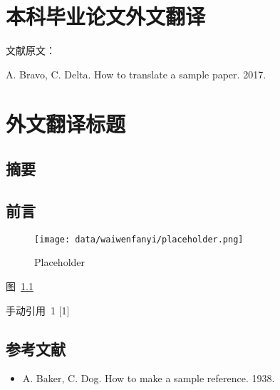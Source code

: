 {
\renewcommand{\baselinestretch}{1.25}\selectfont

{
  \titleformat{\chapter}[block]{\erhao\songti\bfseries\filcenter}{}{0em}{}{}
  \chapter{本科毕业论文外文翻译}
}

{
  \setlength{\parindent}{0em}

  文献原文：

  A. Bravo, C. Delta. How to translate a sample paper. 2017. \par
}

\vspace{2em}

{
  \renewcommand{\cleardoublepage}{}
  \renewcommand{\clearpage}{}
  \titleformat{\chapter}[block]{\sanhao\songti\bfseries\filcenter}{}{0em}{}{}
  \chapter*{外文翻译标题}
}

\section*{摘要}

\section{前言}

\begin{figure}[!htbp]
\centering
\texttt{[image: data/waiwenfanyi/placeholder.png]}
\caption{Placeholder}
\label{figure:placeholder}
\end{figure}

图~\ref{figure:placeholder}

手动引用~1 {[}1{]}

\section{参考文献}

\begin{itemize}
\item [{[}1{]}] A. Baker, C. Dog. How to make a sample reference. 1938.
\end{itemize}
}

